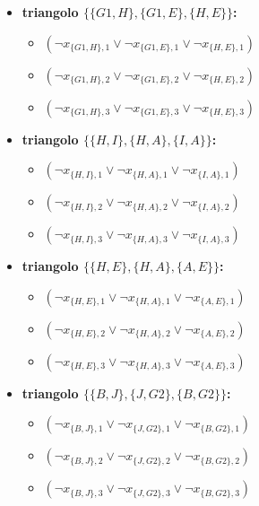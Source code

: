 \documentclass[10pt]{article}
\begin{document}
\begin{itemize}
    \item \textbf{triangolo $\{\{G1, H\}, \{G1, E\}, \{H, E\}\}$:}
    \begin{itemize}
        \item $(\neg x_{\{G1, H\},1} \lor \neg x_{\{G1, E\},1} \lor \neg x_{\{H, E\},1})$
        \item $(\neg x_{\{G1, H\},2} \lor \neg x_{\{G1, E\},2} \lor \neg x_{\{H, E\},2})$
        \item $(\neg x_{\{G1, H\},3} \lor \neg x_{\{G1, E\},3} \lor \neg x_{\{H, E\},3})$
    \end{itemize}

    \item \textbf{triangolo $\{\{H, I\}, \{H, A\}, \{I, A\}\}$:}
    \begin{itemize}
        \item $(\neg x_{\{H, I\},1} \lor \neg x_{\{H, A\},1} \lor \neg x_{\{I, A\},1})$
        \item $(\neg x_{\{H, I\},2} \lor \neg x_{\{H, A\},2} \lor \neg x_{\{I, A\},2})$
        \item $(\neg x_{\{H, I\},3} \lor \neg x_{\{H, A\},3} \lor \neg x_{\{I, A\},3})$
    \end{itemize}

    \item \textbf{triangolo $\{\{H, E\}, \{H, A\}, \{A, E\}\}$:}
    \begin{itemize}
        \item $(\neg x_{\{H, E\},1} \lor \neg x_{\{H, A\},1} \lor \neg x_{\{A, E\},1})$
        \item $(\neg x_{\{H, E\},2} \lor \neg x_{\{H, A\},2} \lor \neg x_{\{A, E\},2})$
        \item $(\neg x_{\{H, E\},3} \lor \neg x_{\{H, A\},3} \lor \neg x_{\{A, E\},3})$
    \end{itemize}

    \item \textbf{triangolo $\{\{B, J\}, \{J, G2\}, \{B, G2\}\}$:}
    \begin{itemize}
        \item $(\neg x_{\{B, J\},1} \lor \neg x_{\{J, G2\},1} \lor \neg x_{\{B, G2\},1})$
        \item $(\neg x_{\{B, J\},2} \lor \neg x_{\{J, G2\},2} \lor \neg x_{\{B, G2\},2})$
        \item $(\neg x_{\{B, J\},3} \lor \neg x_{\{J, G2\},3} \lor \neg x_{\{B, G2\},3})$
    \end{itemize}


\end{itemize}
\end{document}
